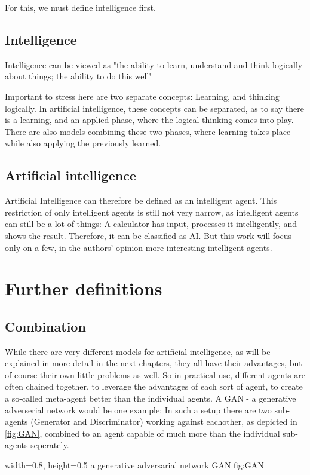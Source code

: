 For this, we must define intelligence first.
\subsection{Intelligence}
Intelligence can be viewed as "the ability to learn, understand and think logically about things; the ability to do this well" 
\cite{intelligence}

Important to stress here are two separate concepts: Learning, and thinking logically.
In artificial intelligence, these concepts can be separated, as to say there is a learning, and an applied phase, where the logical thinking comes into play. %
There are also models combining these two phases, where learning takes place while also applying the previously learned. 

\subsection{Artificial intelligence}
Artificial Intelligence can therefore be defined as an intelligent agent.
This restriction of only intelligent agents is still not very narrow, as intelligent agents can still be a lot of things: A calculator has input, processes it intelligently, and shows the result. Therefore, it can be classified as AI. But this work will focus only on a few, in the authors' opinion more interesting intelligent agents.

\section{Further definitions}
\subsection{Combination}
While there are very different models for artificial intelligence, as will be explained in more detail in the next chapters, they all have their advantages, but of course their own little problems as well. So in practical use, different agents are often chained together, to leverage the advantages of each sort of agent, to create a so-called meta-agent better than the individual agents.
A GAN - a generative adverserial network would be one example: In such a setup there are two sub-agents (Generator and Discriminator) working against eachother, as depicted in \autoref{fig:GAN}, combined to an agent capable of much more than the individual sub-agents seperately.

    {width=0.8\textwidth, height=0.5\textheight} %
    {a generative adversarial network}   %
    {GAN}   %
    {fig:GAN}    %

